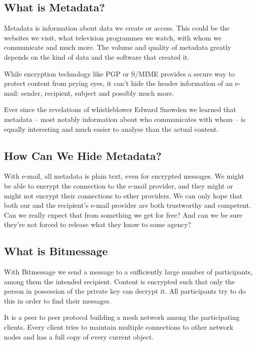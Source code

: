 \documentclass{bfh}
\begin{document}
  \subsection{What is Metadata?}

  Metadata is information about data we create or access. This could be the websites we visit, what television programmes we watch, with whom we communicate and much more. The volume and quality of metadata greatly depends on the kind of data and the software that created it.

  While encryption technology like \ac{PGP} or \acs{S/MIME} provides a secure way to protect content from prying eyes, it can't hide the header information of an e-mail: sender, recipient, subject and possibly much more.

  Ever since the revelations of whistleblower Edward Snowden we learned that metadata -- most notably information about who communicates with whom -- is equally interesting and much easier to analyse than the actual content.\cite{guardian:metadata}

  \subsection{How Can We Hide Metadata?}

  With e-mail, all metadata is plain text, even for encrypted messages. We might be able to encrypt the connection to the e-mail provider, and they might or might not encrypt their connections to other providers. We can only hope that both our and the recipient's e-mail provider are both trustworthy and competent. Can we really expect that from something we get for free? And can we be sure they're not forced to release what they know to some agency?\cite{yale:nsl}

  \subsection{What is Bitmessage}
  
  With Bitmessage we send a message to a sufficiently large number of participants, among them the intended recipient. Content is encrypted such that only the person in possession of the private key can decrypt it. All participants try to do this in order to find their messages.

  It is a peer to peer protocol building a mesh network among the participating clients. Every client tries to maintain multiple connections to other network nodes and has a full copy of every current object.
  
\end{document}
